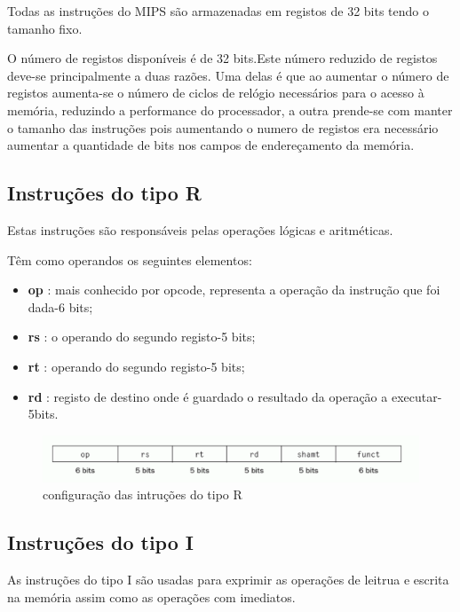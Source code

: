 \documentclass[10pt,a4paper]{book}
\begin{document}
	Todas as instruções do MIPS são armazenadas em registos de 32 bits tendo o tamanho fixo.

	O número de registos disponíveis é de 32 bits.Este número reduzido de registos deve-se principalmente a duas razões. Uma delas é que ao aumentar o número de registos aumenta-se o número de
	ciclos de relógio necessários para o acesso à memória, reduzindo a performance do processador, a outra prende-se com manter o tamanho das instruções pois aumentando o numero de registos era necessário
	aumentar a quantidade de bits nos campos de endereçamento da memória.

	


	\subsection{Instruções do tipo R}

	Estas instruções são responsáveis pelas operações lógicas e aritméticas.

	Têm como operandos os seguintes elementos:
	 \begin{itemize}
	 	\item \textbf{op} : mais conhecido por opcode, representa a operação da instrução que foi dada-6 bits;
	 	\item \textbf{rs} : o operando do segundo registo-5 bits;
	 	\item \textbf{rt} : operando do segundo registo-5 bits;
	 	\item \textbf{rd} : registo de destino onde é guardado o resultado da operação a executar-5bits.
	 \end{itemize}


	\begin{figure}[htp]
	    \centering
	    \includegraphics[scale=0.4]{fig1.png}
	    \caption{configuração das intruções do tipo R}
	    \label{insturçãor}
	\end{figure}



	\subsection{Instruções do tipo I}

	As instruções do tipo I são usadas para exprimir as operações de leitrua e escrita na memória assim como as operações com imediatos.
\end{document}

